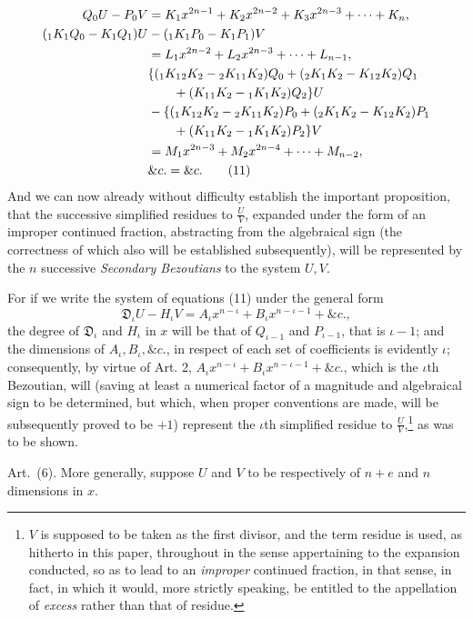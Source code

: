 \documentclass[11pt]{article}
\newcommand{\sourcepage}[1]{\marginpar{\scriptsize p.~#1}}
\newcommand{\art}[1]{\par\smallskip\noindent Art.~(#1).\quad}
\begin{document}
\sourcepage{445}
\begin{align}
Q_0U-P_0V
&=K_1x^{2n-1}+K_2x^{2n-2}+K_3x^{2n-3}+\cdots+K_n,\notag\\
({}_1K_1Q_0-K_1Q_1)U
&-({}_1K_1P_0-K_1P_1)V\notag\\
&=L_1x^{2n-2}+L_2x^{2n-3}+\cdots+L_{n-1},\notag\\
&\{({}_1K_1{}_2K_2-{}_2K_1{}_1K_2)Q_0+({}_2K_1K_2-K_1{}_2K_2)Q_1\notag\\
&\qquad +(K_1{}_1K_2-{}_1K_1K_2)Q_2\}U\notag\\
&-\{({}_1K_1{}_2K_2-{}_2K_1{}_1K_2)P_0+({}_2K_1K_2-K_1{}_2K_2)P_1\notag\\
&\qquad +(K_1{}_1K_2-{}_1K_1K_2)P_2\}V\notag\\
&=M_1x^{2n-3}+M_2x^{2n-4}+\cdots+M_{n-2},\notag\\
&\&c.=\&c.
\tag{11}
\end{align}
And we can now already without difficulty establish the important proposition, that the successive simplified residues to $\frac{U}{V}$, expanded under the form of an improper continued fraction, abstracting from the algebraical sign (the correctness of which also will be established subsequently), will be represented by the $n$ successive \emph{Secondary Bezoutians} to the system $U,V$.

For if we write the system of equations (11) under the general form
\[
\mathfrak{D}_\iota U-H_\iota V=A_\iota x^{n-\iota}+B_\iota x^{n-\iota-1}+\&c.,
\]
the degree of $\mathfrak{D}_\iota$ and $H_\iota$ in $x$ will be that of $Q_{\iota-1}$ and $P_{\iota-1}$, that is $\iota-1$; and the dimensions of $A_\iota,B_\iota,\&c.$, in respect of each set of coefficients is evidently $\iota$; consequently, by virtue of Art. 2, $A_\iota x^{n-\iota}+B_\iota x^{n-\iota-1}+\&c.$, which is the $\iota$th Bezoutian, will (saving at least a numerical factor of a magnitude and algebraical sign to be determined, but which, when proper conventions are made, will be subsequently proved to be $+1$) represent the $\iota$th simplified residue to $\frac{U}{V}$,\footnote{$V$ is supposed to be taken as the first divisor, and the term residue is used, as hitherto in this paper, throughout in the sense appertaining to the expansion conducted, so as to lead to an \emph{improper} continued fraction, in that sense, in fact, in which it would, more strictly speaking, be entitled to the appellation of \emph{excess} rather than that of residue.} as was to be shown.

\art{6} More generally, suppose $U$ and $V$ to be respectively of $n+e$ and $n$ dimensions in $x$.
\end{document}
